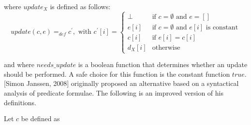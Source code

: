 where $update_{X}$ is defined as follows:%
\begin{equation*}
update(c,e)=_{def}c^{\prime },\text{ with }c^{\prime }[i]=\left\{
\begin{array}{ll}
\bot  & \text{if }c=\emptyset \text{ and }e=[] \\
e[i] & \text{if }c=\emptyset \text{ and }e[i]\text{ is constant} \\
c[i] & \text{if }e[i]=c[i] \\
d_{X}[i] & \text{otherwise}%
\end{array}%
\right.
\end{equation*}

and where $needs\_update$ is a boolean function that determines whether an
update should be performed. A safe choice for this function is the constant
function $true$. [Simon Janssen, 2008] originally proposed an alternative based
on a syntactical analysis of predicate formulae. The following is an improved
version of his definitions.

Let $c$ be defined as

